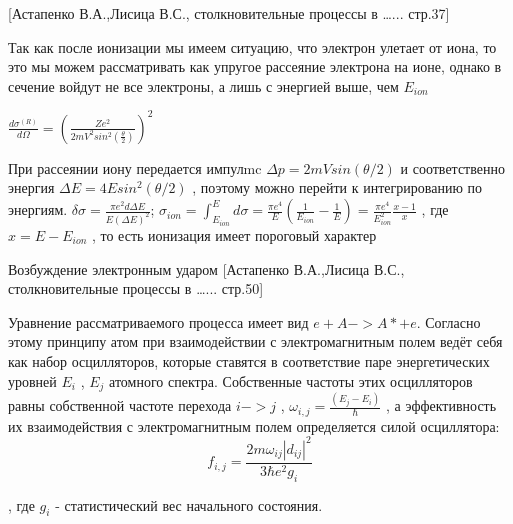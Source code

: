 \documentclass[10pt, a4paper]{article}
\begin{document}
[Астапенко В.А.,Лисица В.С., столкновительные процессы в …... стр.37]

Так как после ионизации мы имеем ситуацию, что электрон улетает от иона, то это мы можем рассматривать как упругое рассеяние электрона на ионе, однако в сечение войдут не все электроны, а лишь с энергией выше, чем $E_{ion}$

$\frac{d\sigma^{(R)}}{d\Omega}=(\frac{Ze^{2}}{2mV^{2}sin^{2}(\frac{\theta}{2})})^{2}$

При рассеянии иону передается импулmc $\Delta p=2mVsin(\theta/2)$ и соответственно энергия $\Delta E=4 E sin^{2}(\theta/2)$ , поэтому можно перейти к интегрированию по энергиям.
$\delta \sigma =\frac {\pi e^{2}d\Delta E}{E(\Delta E)^2}$; 
$\sigma_{ion}=\int_{E_{ion}}^{E} d\sigma=\frac{\pi e^4}{E}(\frac{1}{E_{ion}}-\frac{1}{E})=\frac{\pi e^4}{E_{ion}^{2}}\frac{x-1}{x}$
, где $x=E-E_{ion}$ , то есть ионизация имеет пороговый характер


Возбуждение электронным ударом [Астапенко В.А.,Лисица В.С., столкновительные процессы в …... стр.50]


Уравнение рассматриваемого процесса имеет вид $e + A -> A* + e$. Согласно этому принципу атом при взаимодействии с электромагнитным полем ведёт себя как набор осцилляторов, которые ставятся в соответствие паре энергетических уровней $E_i$ , $E_j$ атомного спектра. Собственные частоты этих осцилляторов равны собственной частоте перехода $i -> j$ , $\omega _{i,j}=\frac{(E_j-E_i)}{\hbar}$ , а эффективность их взаимодействия с электромагнитным полем определяется силой осциллятора:
\begin{equation}
f_{i,j}=\frac{2m\omega_{ij} {|d_{ij}|}^{2} }{3\hbar e^{2} g_i}
\end{equation}

, где $g_i$ - статистический вес начального состояния. 
\end{document}
